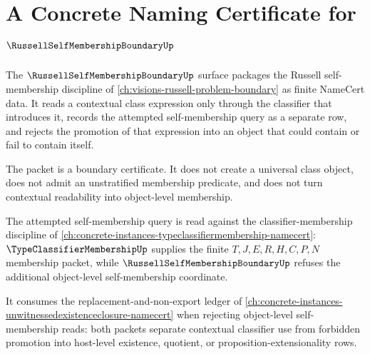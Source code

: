 \chapter{A Concrete Naming Certificate for $\RussellSelfMembershipBoundaryUp$}
\label{ch:concrete-instances-russell-self-membership-boundary-namecert}

The $\RussellSelfMembershipBoundaryUp$ surface packages the Russell self-membership discipline of \autoref{ch:visions-russell-problem-boundary} as finite NameCert data. It reads a contextual class expression only through the classifier that introduces it, records the attempted self-membership query as a separate row, and rejects the promotion of that expression into an object that could contain or fail to contain itself.

The packet is a boundary certificate. It does not create a universal class object, does not admit an unstratified membership predicate, and does not turn contextual readability into object-level membership.

The attempted self-membership query is read against the classifier-membership discipline of \autoref{ch:concrete-instances-typeclassifiermembership-namecert}: $\TypeClassifierMembershipUp$ supplies the finite $T,J,E,R,H,C,P,N$ membership packet, while $\RussellSelfMembershipBoundaryUp$ refuses the additional object-level self-membership coordinate.

It consumes the replacement-and-non-export ledger of \autoref{ch:concrete-instances-unwitnessedexistenceclosure-namecert} when rejecting object-level self-membership reads: both packets separate contextual classifier use from forbidden promotion into host-level existence, quotient, or proposition-extensionality rows.

